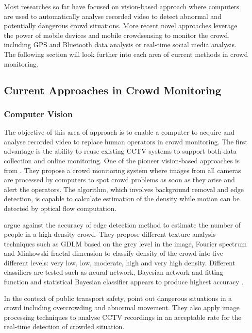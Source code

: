 Most researches so far have focused on vision-based approach where computers are used to automatically analyse recorded video to detect abnormal and potentially dangerous crowd situations. More recent novel approaches leverage the power of mobile devices and mobile crowdsensing to monitor the crowd, including GPS and Bluetooth data analysis or real-time social media analysis. The following section will look further into each area of current methods in crowd monitoring. 

\subsection{Current Approaches in Crowd Monitoring}
\subsubsection{Computer Vision}
The objective of this area of approach is to enable a computer to acquire and analyse recorded video to replace human operators in crowd monitoring. The first advantage is the ability to reuse existing CCTV systems to support both data collection and online monitoring. One of the pioneer vision-based approaches is from \citet{Davies1995}. They propose a crowd monitoring system where images from all cameras are processed by computers to spot crowd problems as soon as they arise and alert the operators. The algorithm, which involves background removal and edge detection, is capable to calculate estimation of the density while motion can be detected by optical flow computation.

\citet{Marana1997} argue against the accuracy of edge detection method to estimate the number of people in a high density crowd. They propose different texture analysis techniques such as GDLM based on the grey level in the image, Fourier spectrum and Minkowski fractal dimension \citep{Marana1999} to classify density of the crowd into five different levels: very low, low, moderate, high and very high density. Different classifiers are tested such as neural network, Bayesian network and fitting function and statistical Bayesian classifier appears to produce highest accuracy \citep{Marana1998}.

In the context of public transport safety, \citet{Velastin1999} point out dangerous situations in a crowd including overcrowding and abnormal movement. They also apply image processing techniques to analyse CCTV recordings in an acceptable rate for the real-time detection of crowded situation.


